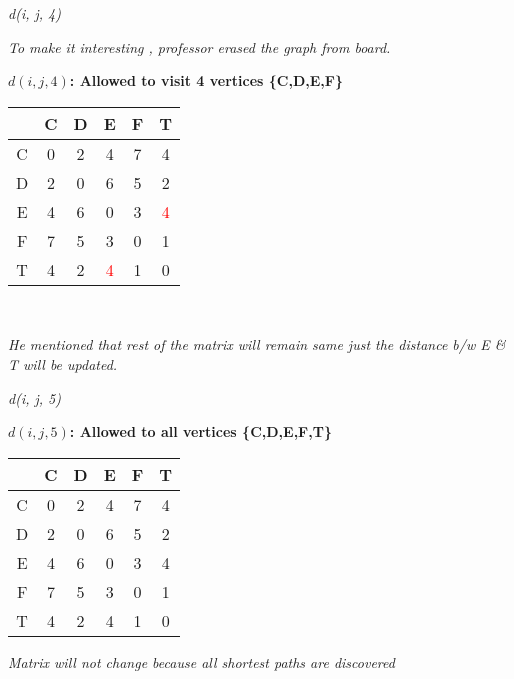 \begin{frame}{\textit{d(i, j, 4)}}

\centering
\textit{To make it interesting , professor erased the graph from board.}
\vspace{1em}

\textbf{$d(i, j, 4)$: Allowed to visit 4 vertices {\textcolor{myNewColorA}{\{C,D,E,F\}}}}

\begin{tabular}{c|ccccc}
     & C & D & E & F & T \\
    \hline
    C & 0 & 2 & 4 & 7 & 4 \\
    D & 2 & 0 & 6 & 5 & 2 \\
    E & 4 & 6 & 0 & 3 & \textcolor{red} 4 \\
    F & 7 & 5 & 3 & 0 &1 \\
    T & 4 & 2 & \textcolor{red}4 & 1 & 0 \\
\end{tabular}

\vspace{1em}

\textcolor{gray}{} \\
\vspace{1em}
\begin{minipage}{\linewidth}

\textit{He mentioned that rest of the matrix will remain same just the distance b/w E \& T will be updated.}
\end{minipage}



\end{frame}

\begin{frame}{\textit{d(i, j, 5)}}

\centering

\vspace{1em}

\textbf{$d(i, j, 5)$: Allowed to all vertices 
{\textcolor{myNewColorA}{\{C,D,E,F,T\}}}}
\begin{tabular}{c|ccccc}
     & C & D & E & F & T \\
    \hline
    C & 0 & 2 & 4 & 7 & 4 \\
    D & 2 & 0 & 6 & 5 & 2 \\
    E & 4 & 6 & 0 & 3 & 4 \\
    F & 7 & 5 & 3 & 0 & 1 \\
    T & 4 & 2 & 4 & 1 & 0 \\
\end{tabular}

\vspace{1em}

\textit{Matrix will not change because all shortest paths are discovered}

\end{frame}

